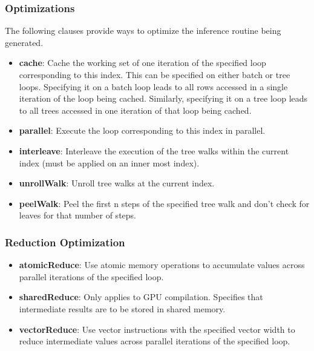 \subsubsection{Optimizations}
The following clauses provide ways to optimize the inference routine being generated.
\begin{itemize}
  \item \textbf{cache}: Cache the working set of one iteration of the specified loop corresponding
  to this index. This can be specified on either batch or tree loops. Specifying it 
  on a batch loop leads to all rows accessed in a single iteration of the loop 
  being cached. Similarly, specifying it on a tree loop leads to all trees accessed in 
  one iteration of that loop being cached.
  \item \textbf{parallel}: Execute the loop corresponding to this index in parallel.
  \item \textbf{interleave}: Interleave the execution of the tree walks within the current index (must be applied on an inner most index).
  \item \textbf{unrollWalk}: Unroll tree walks at the current index. 
  \item \textbf{peelWalk}: Peel the first n steps of the specified tree walk and don't check for leaves for that number of steps.
\end{itemize}

\subsubsection{Reduction Optimization}
\begin{itemize}
  \item \textbf{atomicReduce}: Use atomic memory operations to accumulate values across 
  parallel iterations of the specified loop. 
  \item \textbf{sharedReduce}: Only applies to GPU compilation. Specifies that intermediate
  results are to be stored in shared memory.
  \item \textbf{vectorReduce}: Use vector instructions with the specified vector width 
  to reduce intermediate values across parallel iterations of the specified loop.
\end{itemize}

